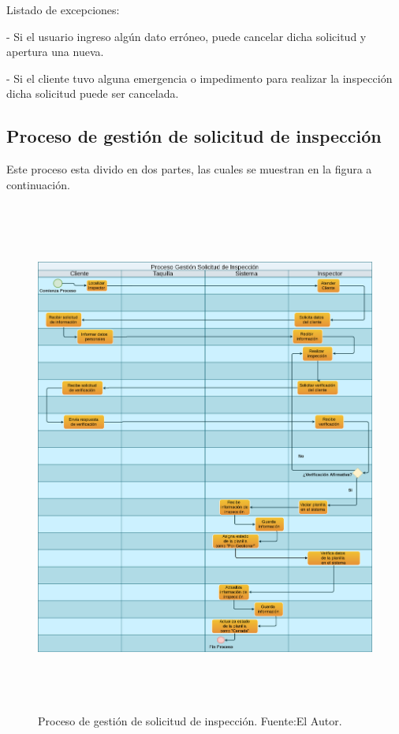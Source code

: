 Listado de excepciones:

- Si el usuario ingreso algún dato erróneo, puede cancelar dicha solicitud y apertura una nueva.

- Si el cliente tuvo alguna emergencia o impedimento para realizar la inspección dicha solicitud puede ser cancelada.

\setlength{\parskip}{0mm}

\newpage
\subsection{Proceso de gestión de solicitud de inspección}
\setlength{\parskip}{5mm}

Este proceso esta divido en dos partes, las cuales se muestran en la figura a continuación.


\begin{figure}[H]
\begin{center}
	\includegraphics[width=\textwidth,height=17cm]{img/diagramas/proceso_gestion_solicitud.png}
\end{center}
\caption{Proceso de gestión de solicitud de inspección. Fuente:El Autor.}
\label{fig:proceso_solicitud_inspeccion}
\end{figure}


